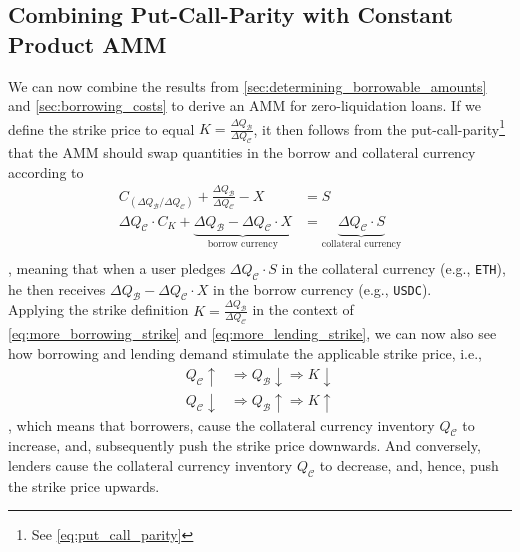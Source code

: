 \documentclass[a4paper]{article}
\begin{document}
\subsection{Combining Put-Call-Parity with Constant Product AMM}
\label{sec:combining_put_call_parity_with_AMM}
We can now combine the results from \cref{sec:determining_borrowable_amounts} and \cref{sec:borrowing_costs} to derive an AMM for zero-liquidation loans. If we define the strike price to equal $K=\frac{\Delta Q_\mathcal{B}}{\Delta Q_\mathcal{C}}$, it then follows from the put-call-parity\footnote{See \cref{eq:put_call_parity}} that the AMM should swap quantities in the borrow and collateral currency according to
\begin{equation}
\begin{split}
C_{(\Delta Q_{\mathcal{B}}/\Delta Q_\mathcal{C})} + \frac{\Delta Q_{\mathcal{B}}}{\Delta Q_{\mathcal{C}}} - X &= S \\
\Delta Q_\mathcal{C} \cdot C_{K} + \underbrace{\Delta Q_\mathcal{B} - \Delta Q_\mathcal{C} \cdot  X}_{\textrm{borrow currency}} &= \underbrace{\Delta Q_\mathcal{C} \cdot  S}_{\textrm{collateral currency}} \\
\end{split}
\end{equation}
, meaning that when a user pledges $\Delta Q_\mathcal{C} \cdot S$ in the collateral currency (e.g., \verb|ETH|), he then receives $\Delta Q_\mathcal{B} - \Delta Q_\mathcal{C} \cdot X$ in the borrow currency (e.g., \verb|USDC|).\\

Applying the strike definition $K=\frac{\Delta Q_\mathcal{B}}{\Delta Q_\mathcal{C}}$ in the context of \cref{eq:more_borrowing_strike} and \cref{eq:more_lending_strike}, we can now also see how borrowing and lending demand stimulate the applicable strike price, i.e., 
\begin{equation}
\begin{split}
Q_{\mathcal{C}}\uparrow& \Rightarrow Q_{\mathcal{B}}\downarrow \Rightarrow K \downarrow\\
Q_{\mathcal{C}}\downarrow& \Rightarrow Q_{\mathcal{B}} \uparrow \Rightarrow K \uparrow
\end{split}
\end{equation}
, which means that borrowers, cause the collateral currency inventory $Q_{\mathcal{C}}$ to increase, and, subsequently push the strike price downwards. And conversely, lenders cause the collateral currency inventory $Q_{\mathcal{C}}$ to decrease, and, hence, push the strike price upwards.
\end{document}
